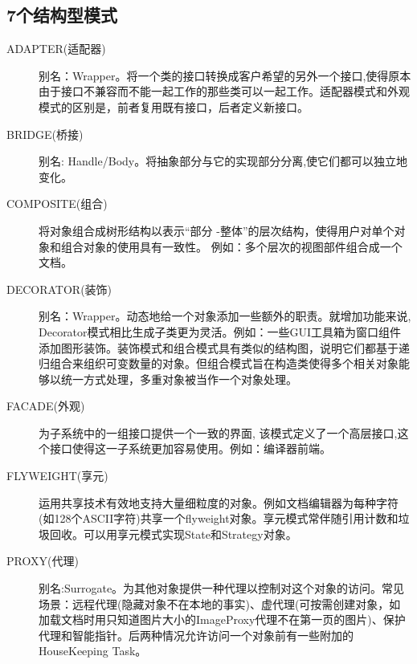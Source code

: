 \subsection{7个结构型模式}
\begin{description}
\item [ADAPTER(适配器)]
别名：Wrapper。将一个类的接口转换成客户希望的另外一个接口,使得原本由于接口不兼容而不能一起工作的那些类可以一起工作。适配器模式和外观模式的区别是，前者复用既有接口，后者定义新接口。
\item [BRIDGE(桥接)]
别名: Handle/Body。将抽象部分与它的实现部分分离,使它们都可以独立地变化。
\item [COMPOSITE(组合)]
将对象组合成树形结构以表示“部分 -整体”的层次结构，使得用户对单个对象和组合对象的使用具有一致性。
例如：多个层次的视图部件组合成一个文档。
\item [DECORATOR(装饰)]
别名：Wrapper。动态地给一个对象添加一些额外的职责。就增加功能来说, Decorator模式相比生成子类更为灵活。例如：一些GUI工具箱为窗口组件添加图形装饰。装饰模式和组合模式具有类似的结构图，说明它们都基于递归组合来组织可变数量的对象。但组合模式旨在构造类使得多个相关对象能够以统一方式处理，多重对象被当作一个对象处理。
\item [FACADE(外观)]
为子系统中的一组接口提供一个一致的界面, 该模式定义了一个高层接口,这个接口使得这一子系统更加容易使用。例如：编译器前端。
\item [FLYWEIGHT(享元)]
运用共享技术有效地支持大量细粒度的对象。例如文档编辑器为每种字符(如128个ASCII字符)共享一个flyweight对象。享元模式常伴随引用计数和垃圾回收。可以用享元模式实现State和Strategy对象。
\item [PROXY(代理)]
别名:Surrogate。为其他对象提供一种代理以控制对这个对象的访问。常见场景：远程代理(隐藏对象不在本地的事实)、虚代理(可按需创建对象，如加载文档时用只知道图片大小的ImageProxy代理不在第一页的图片)、保护代理和智能指针。后两种情况允许访问一个对象前有一些附加的HouseKeeping Task。
\end{description}

